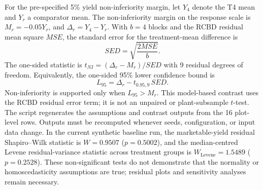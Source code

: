 \documentclass[10pt,twocolumn,a4paper]{article}
\begin{document}
For the pre-specified 5\% yield non-inferiority margin, let $Y_4$ denote the T4 mean and $Y_r$ a comparator mean. The non-inferiority margin on the response scale is $M_r=-0.05Y_r$, and $\Delta_r=Y_4-Y_r$. With $b=4$ blocks and the RCBD residual mean square $MSE$, the standard error for the treatment-mean difference is
\[
 SED=\sqrt{\frac{2MSE}{b}}.
\]
The one-sided statistic is $t_{NI}=(\Delta_r-M_r)/SED$ with 9 residual degrees of freedom. Equivalently, the one-sided 95\% lower confidence bound is
\[
 L_{95}=\Delta_r-t_{0.95,9}\,SED.
\]
Non-inferiority is supported only when $L_{95}>M_r$. This model-based contrast uses the RCBD residual error term; it is not an unpaired or plant-subsample $t$-test. The script  regenerates the assumptions and contrast outputs from the 16 plot-level rows. Outputs must be recomputed whenever seeds, configuration, or input data change. In the current synthetic baseline run, the marketable-yield residual Shapiro--Wilk statistic is $W=0.9507$ ($p=0.5002$), and the median-centred Levene residual-variance statistic across treatment groups is $W_{\mathrm{Levene}}=1.5489$ ($p=0.2528$). These non-significant tests do not demonstrate that the normality or homoscedasticity assumptions are true; residual plots and sensitivity analyses remain necessary.
\end{document}
